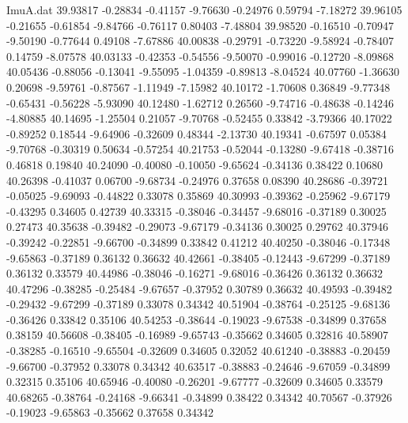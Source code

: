 \begin{filecontents}{ImuA.dat}
  39.93817   -0.28834   -0.41157   -9.76630   -0.24976    0.59794   -7.18272
  39.96105   -0.21655   -0.61854   -9.84766   -0.76117    0.80403   -7.48804
  39.98520   -0.16510   -0.70947   -9.50190   -0.77644    0.49108   -7.67886
  40.00838   -0.29791   -0.73220   -9.58924   -0.78407    0.14759   -8.07578
  40.03133   -0.42353   -0.54556   -9.50070   -0.99016   -0.12720   -8.09868
  40.05436   -0.88056   -0.13041   -9.55095   -1.04359   -0.89813   -8.04524
  40.07760   -1.36630    0.20698   -9.59761   -0.87567   -1.11949   -7.15982
  40.10172   -1.70608    0.36849   -9.77348   -0.65431   -0.56228   -5.93090
  40.12480   -1.62712    0.26560   -9.74716   -0.48638   -0.14246   -4.80885
  40.14695   -1.25504    0.21057   -9.70768   -0.52455    0.33842   -3.79366
  40.17022   -0.89252    0.18544   -9.64906   -0.32609    0.48344   -2.13730
  40.19341   -0.67597    0.05384   -9.70768   -0.30319    0.50634   -0.57254
  40.21753   -0.52044   -0.13280   -9.67418   -0.38716    0.46818    0.19840
  40.24090   -0.40080   -0.10050   -9.65624   -0.34136    0.38422    0.10680
  40.26398   -0.41037    0.06700   -9.68734   -0.24976    0.37658    0.08390
  40.28686   -0.39721   -0.05025   -9.69093   -0.44822    0.33078    0.35869
  40.30993   -0.39362   -0.25962   -9.67179   -0.43295    0.34605    0.42739
  40.33315   -0.38046   -0.34457   -9.68016   -0.37189    0.30025    0.27473
  40.35638   -0.39482   -0.29073   -9.67179   -0.34136    0.30025    0.29762
  40.37946   -0.39242   -0.22851   -9.66700   -0.34899    0.33842    0.41212
  40.40250   -0.38046   -0.17348   -9.65863   -0.37189    0.36132    0.36632
  40.42661   -0.38405   -0.12443   -9.67299   -0.37189    0.36132    0.33579
  40.44986   -0.38046   -0.16271   -9.68016   -0.36426    0.36132    0.36632
  40.47296   -0.38285   -0.25484   -9.67657   -0.37952    0.30789    0.36632
  40.49593   -0.39482   -0.29432   -9.67299   -0.37189    0.33078    0.34342
  40.51904   -0.38764   -0.25125   -9.68136   -0.36426    0.33842    0.35106
  40.54253   -0.38644   -0.19023   -9.67538   -0.34899    0.37658    0.38159
  40.56608   -0.38405   -0.16989   -9.65743   -0.35662    0.34605    0.32816
  40.58907   -0.38285   -0.16510   -9.65504   -0.32609    0.34605    0.32052
  40.61240   -0.38883   -0.20459   -9.66700   -0.37952    0.33078    0.34342
  40.63517   -0.38883   -0.24646   -9.67059   -0.34899    0.32315    0.35106
  40.65946   -0.40080   -0.26201   -9.67777   -0.32609    0.34605    0.33579
  40.68265   -0.38764   -0.24168   -9.66341   -0.34899    0.38422    0.34342
  40.70567   -0.37926   -0.19023   -9.65863   -0.35662    0.37658    0.34342

\end{filecontents}
